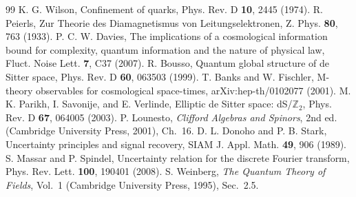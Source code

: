 \documentclass[aps,prd,twocolumn,superscriptaddress,nofootinbib]{revtex4-2}
\begin{document}
\begin{thebibliography}{99}
 K. G. Wilson, Confinement of quarks, Phys. Rev. D \textbf{10}, 2445 (1974).
 R. Peierls, Zur Theorie des Diamagnetismus von Leitungselektronen, Z. Phys. \textbf{80}, 763 (1933).
 P. C. W. Davies, The implications of a cosmological information bound for complexity, quantum information and the nature of physical law, Fluct. Noise Lett. \textbf{7}, C37 (2007).
 R. Bousso, Quantum global structure of de Sitter space, Phys. Rev. D \textbf{60}, 063503 (1999).
 T. Banks and W. Fischler, M-theory observables for cosmological space-times, arXiv:hep-th/0102077 (2001).
 M. K. Parikh, I. Savonije, and E. Verlinde, Elliptic de Sitter space: dS/$\mathbb{Z}_2$, Phys. Rev. D \textbf{67}, 064005 (2003).
 P. Lounesto, \emph{Clifford Algebras and Spinors}, 2nd ed. (Cambridge University Press, 2001), Ch.~16.
 D. L. Donoho and P. B. Stark, Uncertainty principles and signal recovery, SIAM J. Appl. Math. \textbf{49}, 906 (1989).
 S. Massar and P. Spindel, Uncertainty relation for the discrete Fourier transform, Phys. Rev. Lett. \textbf{100}, 190401 (2008).
 S. Weinberg, \emph{The Quantum Theory of Fields}, Vol.~1 (Cambridge University Press, 1995), Sec.~2.5.
\end{thebibliography}
\end{document}
